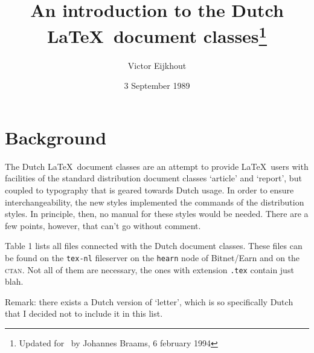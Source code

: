 \documentclass[10pt]{artikel1} %
\newcommand\file[1]{\texttt{#1}}
\begin{document}
\title{An introduction to the Dutch \LaTeX\ document
  classes\thanks{Updated for \LaTeXe\ by Johannes Braams, 6 february
    1994}}
\author{Victor Eijkhout}
\date{3 September 1989}
\maketitle

\section{Background}

The Dutch \LaTeX\ document classes are an attempt to provide \LaTeX\ 
users with facilities of the standard distribution document classes
`article' and `report', but coupled to typography that is geared
towards Dutch usage.  In order to ensure interchangeability, the new
styles implemented the commands of the distribution styles.  In
principle, then, no manual for these styles would be needed.  There
are a few points, however, that can't go without comment.

Table 1 lists all files connected with the Dutch document classes.
These files can be found on the \texttt{tex-nl} fileserver
on the \texttt{hearn} node of Bitnet/Earn and on the \textsc{ctan}.
Not all of them are necessary, the ones with extension \file{.tex}
contain just blah.

Remark: there exists a Dutch version of `letter', which is so
specifically Dutch that I decided not to include it in this list.
\end{document}
